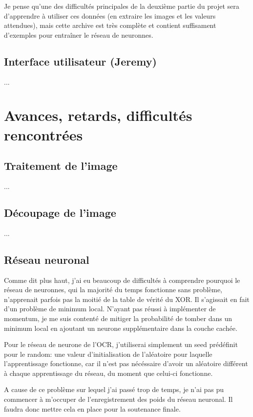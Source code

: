 \documentclass[12pt]{report}
\begin{document}
Je pense qu'une des difficultés principales de la deuxième partie du projet sera d'apprendre à utiliser ces données (en extraire les images et les valeurs attendues), mais cette archive est très complète et contient suffisament d'exemples pour entraîner le réseau de neuronnes.

\section{Interface utilisateur (Jeremy)}

...

\newpage
\chapter{Avances, retards, difficultés rencontrées}

\section*{Traitement de l'image}

...

\section*{Découpage de l'image}

...

\section*{Réseau neuronal}

Comme dit plus haut, j'ai eu beaucoup de difficultés à comprendre pourquoi le réseau de neuronnes, qui la majorité du temps fonctionne sans problème, n'apprenait parfois pas la moitié de la table de vérité du XOR. Il s'agissait en fait d'un problème de minimum local. N'ayant pas réussi à implémenter de momentum, je me suis contenté de mitiger la probabilité de tomber dans un minimum local en ajoutant un neurone supplémentaire dans la couche cachée.

Pour le réseau de neurone de l'OCR, j'utiliserai simplement un seed prédéfinit pour le random: une valeur d'initialisation de l'aléatoire pour laquelle l'apprentissage fonctionne, car il n'est pas nécéssaire d'avoir un aléatoire différent à chaque apprentissage du réseau, du moment que celui-ci fonctionne.

A cause de ce problème sur lequel j'ai passé trop de temps, je n'ai pas pu commencer à m'occuper de l'enregistrement des poids du réseau neuronal. Il faudra donc mettre cela en place pour la soutenance finale.
\end{document}
